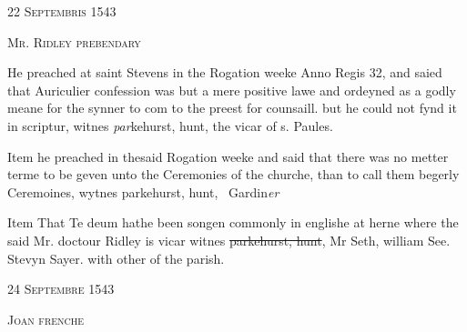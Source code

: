 \documentclass[12pt, a4paper]{book}
\begin{document}
               
				\begin{center} \begin{large} {\scshape 
                  22 Septembris 1543
               } \end{large} \end{center}
			
               
                  
				\begin{center}  {\scshape Mr. Ridley prebendary}  \end{center}
			

               	
				\marginpar[\vspace{0.5cm}{\textcolor{Gray}{confession}}]{}
			
		\ifthenelse{\isodd{\thepage}}
		{\reversemarginpar}
		{\normalmarginpar}
		He preached at saint Stevens in the Rogation weeke
 Anno Regis 32, and saied that Auriculier confession
 was but a mere positive lawe and ordeyned as
 a godly meane for the synner to com to the preest
 for counsaill. but he could not fynd it in scriptur,
 witnes \textit{par}kehurst, hunt, the vicar of s. Paules.
               	
				\marginpar[\vspace{0.5cm}{\textcolor{Gray}{ceremonies}}]{}
			
		\ifthenelse{\isodd{\thepage}}
		{\reversemarginpar}
		{\normalmarginpar}
		Item he preached in thesaid Rogation weeke and said
 that there was no metter terme to be geven unto
 the Ceremonies of the churche, than to call them
 begerly Ceremoines, wytnes parkehurst, hunt, 
 Gardin\textit{er}
 
		\ifthenelse{\isodd{\thepage}}
		{\reversemarginpar}
		{\normalmarginpar}
		Item That Te deum hathe been songen commonly
 in englishe at herne where the said Mr. doctour
 Ridley is vicar
 witnes \sout{parkehurst, hunt}, Mr Seth, william See. Stevyn
 Sayer. with other of the parish.
 

            
            
               
				\begin{center} \begin{large} {\scshape 
                  24 Septembre 1543
               } \end{large} \end{center}
			
               
                  
				\begin{center}  {\scshape Joan frenche}  \end{center}
			
\end{document}
